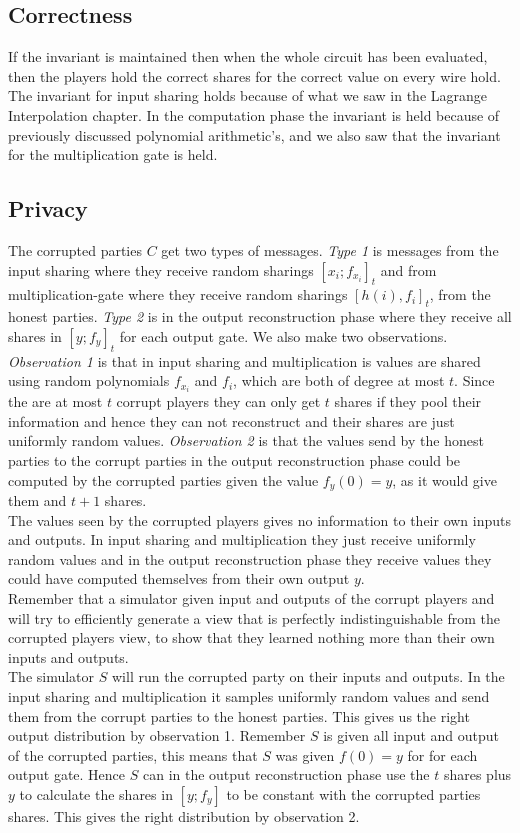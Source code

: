 \subsection{Correctness}
If the invariant is maintained then when the whole circuit has been evaluated, then the players hold the correct shares for the correct value on every wire hold. The invariant for input sharing holds because of what we saw in the Lagrange Interpolation chapter. In the computation phase the invariant is held because of previously discussed polynomial arithmetic's, and we also saw that the invariant for the multiplication gate is held. 

\subsection{Privacy}
The corrupted parties $C$ get two types of messages. \emph{Type 1} is messages from the input sharing where they receive random sharings $[x_i;f_{x_i}]_t$ and from multiplication-gate where they receive random sharings $[h(i),f_i]_t$, from the honest parties. \emph{Type 2} is in the output reconstruction phase where they receive all shares in $[y;f_y]_t$ for each output gate. We also make two observations. \emph{Observation 1} is that in input sharing and multiplication is values are shared using random polynomials $f_{x_i}$ and $f_i$, which are both of degree at most $t$. Since the are at most $t$ corrupt players they can only get $t$ shares if they pool their information and hence they can not reconstruct and their shares are just uniformly random values. \emph{Observation 2} is that the values send by the honest parties to the corrupt parties in the output reconstruction phase could be computed by the corrupted parties given the value $f_y(0)=y$, as it would give them and $t+1$ shares. \\

The values seen by the corrupted players gives no information to their own inputs and outputs. In input sharing and multiplication they just receive uniformly random values and in the output reconstruction phase they receive values they could have computed themselves from their own output $y$. \\

Remember that a simulator given input and outputs of the corrupt players and will try to efficiently generate a view that is perfectly indistinguishable from the corrupted players view, to show that they learned nothing more than their own inputs and outputs. \\
The simulator $S$ will run the corrupted party on their inputs and outputs. In the input sharing and multiplication it samples uniformly random values and send them from the corrupt parties to the honest parties. This gives us the right output distribution by observation 1. Remember $S$ is given all input and output of the corrupted parties, this means that $S$ was given $f(0)=y$ for for each output gate. Hence $S$ can in the output reconstruction phase use the $t$ shares plus $y$ to calculate the shares in $[y;f_y]$ to be constant with the corrupted parties shares. This gives the right distribution by observation 2.


